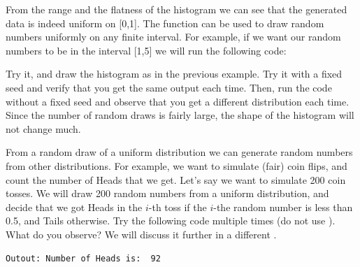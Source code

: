 From the range and the flatness of the histogram we can see that the generated data is indeed uniform on [0,1]. The  function can be used to draw random numbers uniformly on any finite interval. For example, if we want our random numbers to be in the interval [1,5] we will run the following code:

\begin{knitrout}
\color{fgcolor}\begin{kframe}
\begin{alltt}
 \hlkwb{<-} 
 \hlkwb{<-}  \hlstd{=}\hlstd{,} \hlstd{=}\hlstd{)}
\end{alltt}
\end{kframe}
\end{knitrout}

Try it, and draw the histogram as in the previous example. Try it with a fixed seed and verify that you get the same output each time. Then, run the code without a fixed seed and observe that you get a different distribution each time. Since the number of random draws is fairly large, the shape of the histogram will not change much.

From a random draw of a uniform distribution we can generate random numbers from other distributions. For example, we want to simulate (fair) coin flips, and count the number of Heads that we get. Let's say we want to simulate 200 coin tosses. We will draw 200 random numbers from a uniform distribution, and decide that we got Heads in the $i$-th toss if the $i$-the random number is less than 0.5, and Tails otherwise.
Try the following code multiple times (do not use ). What do you observe? We will discuss it further in a different .
\begin{knitrout}
\color{fgcolor}\begin{kframe}
\begin{alltt}
 \hlkwb{<-} 
\hlstd{(}\hlstd{,} \hlstd{(} \hlopt{<} \hlstd{),} \hlstd{)}
\end{alltt}
\begin{verbatim}
Outout: Number of Heads is:  92
\end{verbatim}
\end{kframe}
\end{knitrout}


